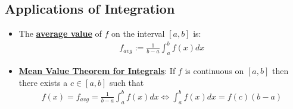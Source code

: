 \documentclass[11pt]{article}
\newcommand{\dfn}[1]{\underline{\textbf{#1}}}
\begin{document}
\subsection{Applications of Integration}
\begin{itemize}[noitemsep]
	\item  The \dfn{average value} of $f$ on the interval $[a,b]$ is: 
	\begin{align}
		f_{avg} := \frac{1}{b-a} \int_a^b f(x) dx 	
	\end{align}
	\item \dfn{Mean Value Theorem for Integrals}: If $f$ is continuous on $[a,b]$ then there exists a $c \in [a,b]$ such that
	\begin{align}
		f(x) = f_{avg} = \frac{1}{b-a} \int_a^b f(x) dx \iff \int_a^b f(x) dx = f(c) (b-a) 	
	\end{align}
\end{itemize}
\end{document}
